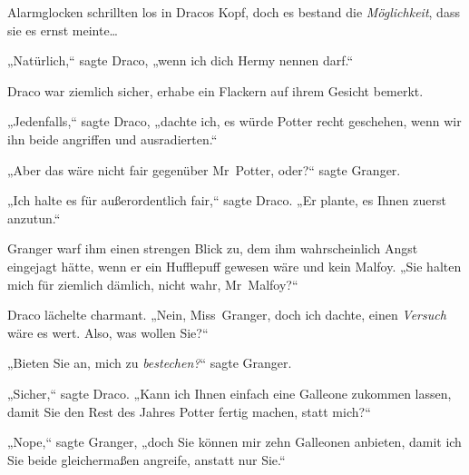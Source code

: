 Alarmglocken schrillten los in Dracos Kopf, doch es bestand die \emph{Möglichkeit}, dass sie es ernst meinte…

„Natürlich,“ sagte Draco, „wenn ich dich Hermy nennen darf.“

Draco war ziemlich sicher, erhabe ein Flackern auf ihrem Gesicht bemerkt.

„Jedenfalls,“ sagte Draco, „dachte ich, es würde Potter recht geschehen, wenn wir ihn beide angriffen und ausradierten.“

„Aber das wäre nicht fair gegenüber Mr~Potter, oder?“ sagte Granger.

„Ich halte es für außerordentlich fair,“ sagte Draco. „Er plante, es Ihnen zuerst anzutun.“

Granger warf ihm einen strengen Blick zu, dem ihm wahrscheinlich Angst eingejagt hätte, wenn er ein Hufflepuff gewesen wäre und kein Malfoy. „Sie halten mich für ziemlich dämlich, nicht wahr, Mr~Malfoy?“

Draco lächelte charmant. „Nein, Miss~Granger, doch ich dachte, einen \emph{Versuch} wäre es wert. Also, was wollen Sie?“

„Bieten Sie an, mich zu \emph{bestechen?}“ sagte Granger.

„Sicher,“ sagte Draco. „Kann ich Ihnen einfach eine Galleone zukommen lassen, damit Sie den Rest des Jahres Potter fertig machen, statt mich?“

„Nope,“ sagte Granger, „doch Sie können mir zehn Galleonen anbieten, damit ich Sie beide gleichermaßen angreife, anstatt nur Sie.“

